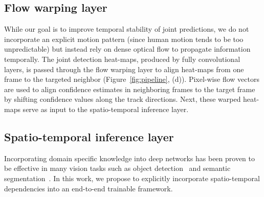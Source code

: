 \documentclass[10pt,twocolumn,letterpaper]{article}
\newcommand{\figref}[1]{Figure~\ref{#1}}
\begin{document}
\subsection{Flow warping layer}\label{subsection:flow-layer}
While our goal is to improve temporal stability of joint predictions, we do not incorporate an explicit motion pattern (since human motion tends to be too unpredictable) but instead rely on dense optical flow to propagate information temporally. The joint detection heat-maps, produced by fully convolutional layers, is passed through the flow warping layer to align heat-maps from one frame to the targeted neighbor (\figref{fig:pipeline}, (d)).
Pixel-wise flow vectors are used to align confidence estimates in neighboring frames to the target frame by shifting confidence values along the track directions. Next, these warped heat-maps serve as input to the spatio-temporal inference layer.

\subsection{Spatio-temporal inference layer}\noindent Incorporating domain specific knowledge into deep networks has been proven to be effective in many vision tasks such as object detection~\cite{girshick2015deformable} and semantic segmentation~\cite{zheng2015conditional}. In this work, we propose to explicitly incorporate spatio-temporal dependencies into an end-to-end trainable framework.\\
\end{document}
